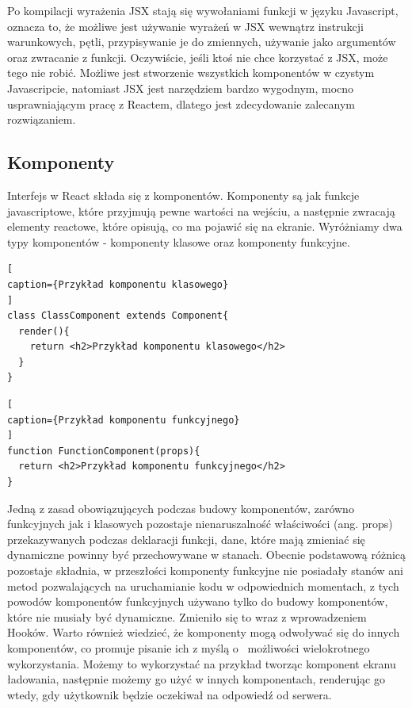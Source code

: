 \documentclass[oneside,polski,logo,indent]{amuthesis}
\begin{document}
{Po kompilacji wyrażenia JSX stają się wywołaniami funkcji w języku Javascript, oznacza to, że możliwe jest używanie wyrażeń w JSX wewnątrz instrukcji warunkowych, pętli, przypisywanie je do zmiennych, używanie jako argumentów oraz zwracanie z funkcji.
Oczywiście, jeśli ktoś nie chce korzystać z JSX, może tego nie robić. Możliwe jest stworzenie wszystkich komponentów w czystym Javascripcie, natomiast JSX jest narzędziem bardzo wygodnym, mocno usprawniającym pracę z Reactem, dlatego jest zdecydowanie zalecanym rozwiązaniem.

}

\subsection{Komponenty}
{
Interfejs w React składa się z komponentów. Komponenty są jak funkcje javascriptowe, które przyjmują pewne wartości na wejściu, a następnie zwracają elementy reactowe, które opisują, co ma pojawić się na ekranie.
Wyróżniamy dwa typy komponentów - komponenty klasowe oraz komponenty funkcyjne.


\begin{lstlisting}[
caption={Przykład komponentu klasowego}
]
class ClassComponent extends Component{
  render(){
    return <h2>Przykład komponentu klasowego</h2>
  }
}

\end{lstlisting}


\begin{lstlisting}[
caption={Przykład komponentu funkcyjnego}
]
function FunctionComponent(props){
  return <h2>Przykład komponentu funkcyjnego</h2>
}

\end{lstlisting}

Jedną z zasad obowiązujących podczas budowy komponentów, zarówno funkcyjnych jak i klasowych pozostaje nienaruszalność właściwości    (ang. props) przekazywanych podczas deklaracji funkcji, dane, które mają zmieniać się dynamiczne powinny być przechowywane w stanach.
Obecnie podstawową różnicą pozostaje składnia, w przeszłości komponenty funkcyjne nie posiadały stanów ani metod pozwalających na uruchamianie kodu w odpowiednich momentach, z tych powodów komponentów funkcyjnych używano tylko do budowy komponentów, które nie musiały być dynamiczne. Zmieniło się to wraz z wprowadzeniem Hooków.
Warto również wiedzieć, że komponenty mogą odwoływać się do innych komponentów, co promuje pisanie ich z myślą o~ możliwości wielokrotnego wykorzystania. Możemy to wykorzystać na przykład tworząc komponent ekranu ładowania, następnie możemy go użyć w innych komponentach, renderując go wtedy, gdy użytkownik będzie oczekiwał na odpowiedź od serwera.
}
\end{document}
